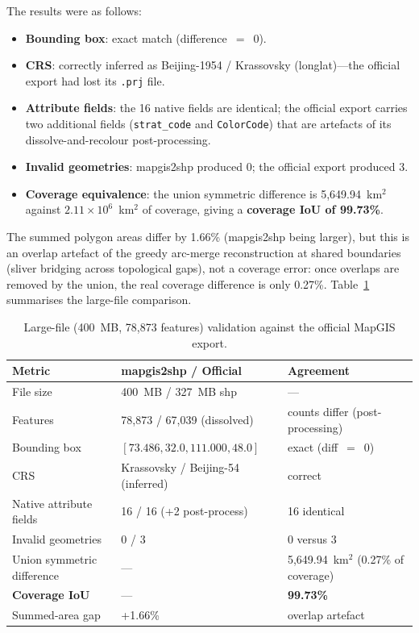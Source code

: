 \documentclass[11pt,a4paper]{article}
\begin{document}
The results were as follows:
\begin{itemize}
  \item \textbf{Bounding box}: exact match (difference~$=$~0).
  \item \textbf{CRS}: correctly inferred as Beijing-1954 / Krassovsky (longlat)---the official export had lost its \texttt{.prj} file.
  \item \textbf{Attribute fields}: the 16 native fields are identical; the official export carries two additional fields (\texttt{strat\_code} and \texttt{ColorCode}) that are artefacts of its dissolve-and-recolour post-processing.
  \item \textbf{Invalid geometries}: mapgis2shp produced 0; the official export produced 3.
  \item \textbf{Coverage equivalence}: the union symmetric difference is 5{,}649.94~km$^{2}$ against $2.11\times10^{6}$~km$^{2}$ of coverage, giving a \textbf{coverage IoU of 99.73\%}.
\end{itemize}
The summed polygon areas differ by 1.66\% (mapgis2shp being larger), but this is an overlap artefact of the greedy arc-merge reconstruction at shared boundaries (sliver bridging across topological gaps), not a coverage error: once overlaps are removed by the union, the real coverage difference is only 0.27\%. Table~\ref{tab:large} summarises the large-file comparison.

\begin{table}[h]
\centering
\caption{Large-file (400~MB, 78{,}873 features) validation against the official MapGIS export.}
\label{tab:large}
\small
\begin{tabular}{lll}
\toprule
Metric & mapgis2shp / Official & Agreement \\
\midrule
File size & 400~MB / 327~MB shp & --- \\
Features & 78{,}873 / 67{,}039 (dissolved) & counts differ (post-processing) \\
Bounding box & $[73.486, 32.0, 111.000, 48.0]$ & exact (diff~$=$~0) \\
CRS & Krassovsky / Beijing-54 (inferred) & correct \\
Native attribute fields & 16 / 16 (+2 post-process) & 16 identical \\
Invalid geometries & 0 / 3 & 0 versus 3 \\
Union symmetric difference & --- & 5{,}649.94~km$^{2}$ (0.27\% of coverage) \\
\textbf{Coverage IoU} & --- & \textbf{99.73\%} \\
Summed-area gap & +1.66\% & overlap artefact \\
\bottomrule
\end{tabular}
\end{table}
\end{document}
